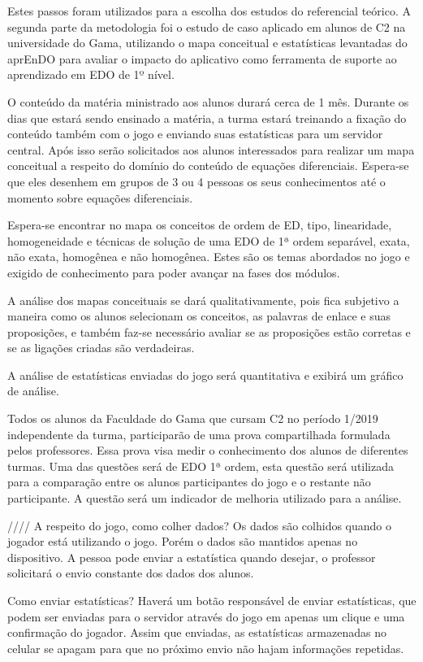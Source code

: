 Estes passos foram utilizados para a escolha dos estudos do referencial teórico.
A segunda parte da metodologia foi o estudo de caso aplicado em alunos de C2 na universidade do Gama, utilizando o mapa conceitual e estatísticas levantadas do aprEnDO para avaliar o impacto do aplicativo como ferramenta de suporte ao aprendizado em EDO de 1º nível.

O conteúdo da matéria ministrado aos alunos durará cerca de 1 mês. Durante os dias que estará sendo ensinado a matéria, a turma estará treinando a fixação do conteúdo também com o jogo e enviando suas estatísticas para um servidor central. Após isso serão solicitados aos alunos interessados para realizar um mapa conceitual a respeito do domínio do conteúdo de equações diferenciais. Espera-se que eles desenhem em grupos de 3 ou 4 pessoas os seus conhecimentos até o momento sobre equações diferenciais. 

Espera-se encontrar no mapa os conceitos de ordem de ED, tipo, linearidade, homogeneidade e técnicas de solução de uma EDO de 1ª ordem separável, exata, não exata, homogênea e não homogênea. Estes são os temas abordados no jogo e exigido de conhecimento para poder avançar na fases dos módulos.

A análise dos mapas conceituais se dará qualitativamente, pois fica subjetivo a maneira como os alunos selecionam os conceitos, as palavras de enlace e suas proposições, e também faz-se necessário avaliar se as proposições estão corretas e se as ligações criadas são verdadeiras.

A análise de estatísticas enviadas do jogo será quantitativa e exibirá um gráfico de análise. 

Todos os alunos da Faculdade do Gama que cursam C2 no período 1/2019 independente da turma, participarão de uma prova compartilhada formulada pelos professores. Essa prova visa medir o conhecimento dos alunos de diferentes turmas. Uma das questões será de EDO 1ª ordem, esta questão será utilizada para a comparação entre os alunos participantes do jogo e o restante não participante. A questão será um indicador de melhoria utilizado para a análise.

////
A respeito do jogo, como colher dados? Os dados são colhidos quando o jogador está utilizando o jogo. Porém o dados são mantidos apenas no dispositivo. A pessoa pode enviar a estatística quando desejar, o professor solicitará o envio constante dos dados dos alunos.

Como enviar estatísticas? Haverá um botão responsável de enviar estatísticas, que podem ser enviadas para o servidor através do jogo em apenas um clique e uma confirmação do jogador. Assim que enviadas, as estatísticas armazenadas no celular se apagam para que no próximo envio não hajam informações repetidas.

